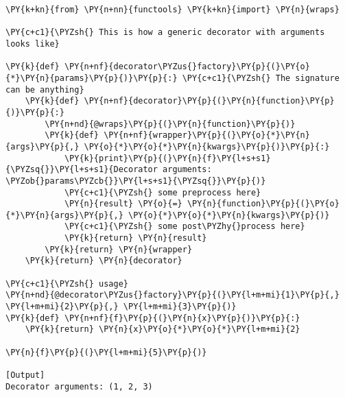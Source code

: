 \begin{Verbatim}[label=\makebox{\url{https://github.com/lucabaldini/cmepda/tree/master/slides/latex/snippets/decorator\_factory.py}},commandchars=\\\{\}]
\PY{k+kn}{from} \PY{n+nn}{functools} \PY{k+kn}{import} \PY{n}{wraps}

\PY{c+c1}{\PYZsh{} This is how a generic decorator with arguments looks like}

\PY{k}{def} \PY{n+nf}{decorator\PYZus{}factory}\PY{p}{(}\PY{o}{*}\PY{n}{params}\PY{p}{)}\PY{p}{:} \PY{c+c1}{\PYZsh{} The signature can be anything}
    \PY{k}{def} \PY{n+nf}{decorator}\PY{p}{(}\PY{n}{function}\PY{p}{)}\PY{p}{:}
        \PY{n+nd}{@wraps}\PY{p}{(}\PY{n}{function}\PY{p}{)}
        \PY{k}{def} \PY{n+nf}{wrapper}\PY{p}{(}\PY{o}{*}\PY{n}{args}\PY{p}{,} \PY{o}{*}\PY{o}{*}\PY{n}{kwargs}\PY{p}{)}\PY{p}{:}
            \PY{k}{print}\PY{p}{(}\PY{n}{f}\PY{l+s+s1}{\PYZsq{}}\PY{l+s+s1}{Decorator arguments: \PYZob{}params\PYZcb{}}\PY{l+s+s1}{\PYZsq{}}\PY{p}{)}
            \PY{c+c1}{\PYZsh{} some preprocess here}
            \PY{n}{result} \PY{o}{=} \PY{n}{function}\PY{p}{(}\PY{o}{*}\PY{n}{args}\PY{p}{,} \PY{o}{*}\PY{o}{*}\PY{n}{kwargs}\PY{p}{)}
            \PY{c+c1}{\PYZsh{} some post\PYZhy{}process here}
            \PY{k}{return} \PY{n}{result}
        \PY{k}{return} \PY{n}{wrapper}
    \PY{k}{return} \PY{n}{decorator}

\PY{c+c1}{\PYZsh{} usage}
\PY{n+nd}{@decorator\PYZus{}factory}\PY{p}{(}\PY{l+m+mi}{1}\PY{p}{,} \PY{l+m+mi}{2}\PY{p}{,} \PY{l+m+mi}{3}\PY{p}{)}
\PY{k}{def} \PY{n+nf}{f}\PY{p}{(}\PY{n}{x}\PY{p}{)}\PY{p}{:}
    \PY{k}{return} \PY{n}{x}\PY{o}{*}\PY{o}{*}\PY{l+m+mi}{2}

\PY{n}{f}\PY{p}{(}\PY{l+m+mi}{5}\PY{p}{)}

[Output]
Decorator arguments: (1, 2, 3)
\end{Verbatim}